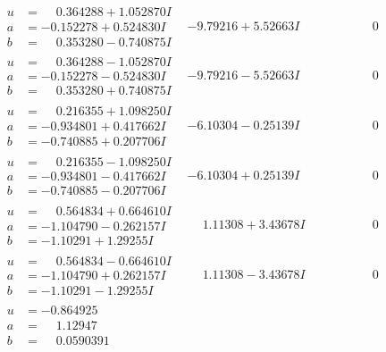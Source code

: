 \documentclass[1p]{elsarticle_modified}
\theoremstyle{definition}
\begin{document}
$$\begin{array}{c|c|c}
\begin{aligned}
u &= \phantom{-}0.364288 + 1.052870 I \\
a &= -0.152278 + 0.524830 I \\
b &= \phantom{-}0.353280 - 0.740875 I\end{aligned}
 & -9.79216 + 5.52663 I & \phantom{-0.000000 } 0 \\ \hline\begin{aligned}
u &= \phantom{-}0.364288 - 1.052870 I \\
a &= -0.152278 - 0.524830 I \\
b &= \phantom{-}0.353280 + 0.740875 I\end{aligned}
 & -9.79216 - 5.52663 I & \phantom{-0.000000 } 0 \\ \hline\begin{aligned}
u &= \phantom{-}0.216355 + 1.098250 I \\
a &= -0.934801 + 0.417662 I \\
b &= -0.740885 + 0.207706 I\end{aligned}
 & -6.10304 - 0.25139 I & \phantom{-0.000000 } 0 \\ \hline\begin{aligned}
u &= \phantom{-}0.216355 - 1.098250 I \\
a &= -0.934801 - 0.417662 I \\
b &= -0.740885 - 0.207706 I\end{aligned}
 & -6.10304 + 0.25139 I & \phantom{-0.000000 } 0 \\ \hline\begin{aligned}
u &= \phantom{-}0.564834 + 0.664610 I \\
a &= -1.104790 - 0.262157 I \\
b &= -1.10291 + 1.29255 I\end{aligned}
 & \phantom{-}1.11308 + 3.43678 I & \phantom{-0.000000 } 0 \\ \hline\begin{aligned}
u &= \phantom{-}0.564834 - 0.664610 I \\
a &= -1.104790 + 0.262157 I \\
b &= -1.10291 - 1.29255 I\end{aligned}
 & \phantom{-}1.11308 - 3.43678 I & \phantom{-0.000000 } 0 \\ \hline\begin{aligned}
u &= -0.864925\phantom{ +0.000000I} \\
a &= \phantom{-}1.12947\phantom{ +0.000000I} \\
b &= \phantom{-}0.0590391\phantom{ +0.000000I}\end{aligned}

\end{array}$$
\end{document}
